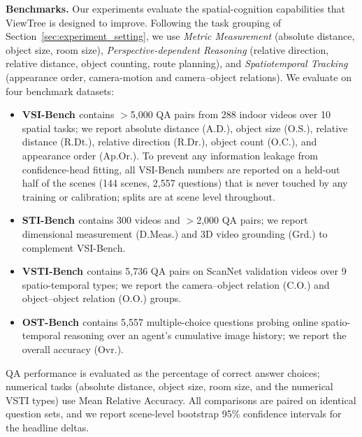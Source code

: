 \noindent\textbf{Benchmarks.} Our experiments evaluate the spatial-cognition capabilities that ViewTree is designed to improve. Following the task grouping of Section~\ref{sec:experiment_setting}, we use \emph{Metric Measurement} (absolute distance, object size, room size), \emph{Perspective-dependent Reasoning} (relative direction, relative distance, object counting, route planning), and \emph{Spatiotemporal Tracking} (appearance order, camera-motion and camera--object relations). We evaluate on four benchmark datasets:
\begin{itemize}
    \item \textbf{VSI-Bench \cite{yang2025thinking}} contains $>$5{,}000 QA pairs from 288 indoor videos over 10 spatial tasks; we report absolute distance (A.D.), object size (O.S.), relative distance (R.Dt.), relative direction (R.Dr.), object count (O.C.), and appearance order (Ap.Or.). To prevent any information leakage from confidence-head fitting, all VSI-Bench numbers are reported on a held-out half of the scenes (144 scenes, 2{,}557 questions) that is never touched by any training or calibration; splits are at scene level throughout.
    \item \textbf{STI-Bench \cite{li2025sti}} contains 300 videos and $>$2{,}000 QA pairs; we report dimensional measurement (D.Meas.) and 3D video grounding (Grd.) to complement VSI-Bench.
    \item \textbf{VSTI-Bench \cite{vstibench2026}} contains 5{,}736 QA pairs on ScanNet validation videos over 9 spatio-temporal types; we report the camera--object relation (C.O.) and object--object relation (O.O.) groups.
    \item \textbf{OST-Bench \cite{ostbench2025}} contains 5{,}557 multiple-choice questions probing online spatio-temporal reasoning over an agent's cumulative image history; we report the overall accuracy (Ovr.).
\end{itemize}
QA performance is evaluated as the percentage of correct answer choices; numerical tasks (absolute distance, object size, room size, and the numerical VSTI types) use Mean Relative Accuracy. All comparisons are paired on identical question sets, and we report scene-level bootstrap 95\% confidence intervals for the headline deltas.

